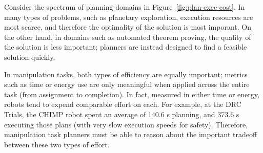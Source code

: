 Consider the spectrum of planning domains
in Figure~\ref{fig:plan-exec-cost}.
In many types of problems,
such as planetary exploration,
execution resources are most scarce,
and therefore the optimality of the solution is most imporant.
On the other hand,
in domains such as automated theorem proving,
the quality of the solution is less important;
planners are instead designed to find a feasible solution quickly.

In manipulation tasks,
both types of efficiency are equally important;
metrics such as time or energy use are only meaningful
when applied across the entire task (from assignment to completion).
In fact, measured in either time or energy,
robots tend to expend comparable effort on each.
For example, at the DRC Trials,
the CHIMP robot spent an average of 140.6 s planning,
and 373.6 s executing those plans
(with very slow execution speeds for safety).
Therefore,
manipulation task planners must be able to reason about
the important tradeoff between these two types of effort.

